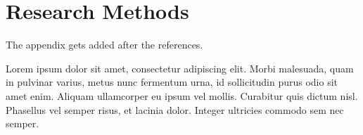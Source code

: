 \documentclass[sigconf, review=true]{acmart}
\begin{document}


\maketitle






\appendix

\section{Research Methods}

The appendix gets added after the references.

Lorem ipsum dolor sit amet, consectetur adipiscing elit. Morbi
malesuada, quam in pulvinar varius, metus nunc fermentum urna, id
sollicitudin purus odio sit amet enim. Aliquam ullamcorper eu ipsum
vel mollis. Curabitur quis dictum nisl. Phasellus vel semper risus, et
lacinia dolor. Integer ultricies commodo sem nec semper.
\end{document}
